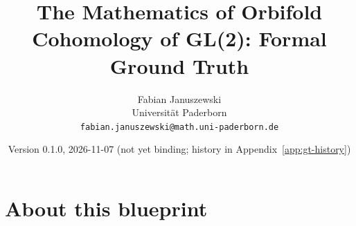 \documentclass[a4paper]{report}
\title{The Mathematics of Orbifold Cohomology of GL(2): Formal Ground Truth}
\author{Fabian Januszewski\\ Universit\"at Paderborn\\ \texttt{fabian.januszewski@math.uni-paderborn.de}}
\date{Version 0.1.0, 2026-11-07 (not yet binding; history in Appendix~\ref{app:gt-history})}
\begin{document}
\maketitle
\chapter*{About this blueprint}



\end{document}
